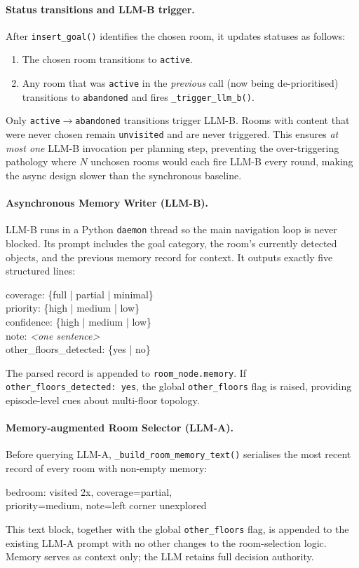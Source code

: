 \documentclass[10pt,twocolumn,letterpaper]{article}
\begin{document}
\paragraph{Status transitions and LLM-B trigger.}
After \texttt{insert\_goal()} identifies the chosen room, it updates
statuses as follows:
\begin{enumerate}[leftmargin=1.4em]
  \item The chosen room transitions to \texttt{active}.
  \item Any room that was \texttt{active} in the \emph{previous} call
        (now being de-prioritised) transitions to \texttt{abandoned} and
        fires \texttt{\_trigger\_llm\_b()}.
\end{enumerate}
Only \texttt{active}$\to$\texttt{abandoned} transitions trigger LLM-B.
Rooms with content that were never chosen remain \texttt{unvisited} and
are never triggered.
This ensures \emph{at most one} LLM-B invocation per planning step,
preventing the over-triggering pathology where $N$ unchosen rooms would
each fire LLM-B every round, making the async design slower than the
synchronous baseline.

\paragraph{Asynchronous Memory Writer (LLM-B).}
LLM-B runs in a Python \texttt{daemon} thread so the main navigation loop
is never blocked.
Its prompt includes the goal category, the room's currently detected
objects, and the previous memory record for context.
It outputs exactly five structured lines:
\begin{center}
\small\ttfamily
coverage: \{full | partial | minimal\}\\
priority: \{high | medium | low\}\\
confidence: \{high | medium | low\}\\
note: \textit{<one sentence>}\\
other\_floors\_detected: \{yes | no\}
\end{center}
The parsed record is appended to \texttt{room\_node.memory}.
If \texttt{other\_floors\_detected: yes}, the global
\texttt{other\_floors} flag is raised, providing episode-level cues about
multi-floor topology.

\paragraph{Memory-augmented Room Selector (LLM-A).}
Before querying LLM-A, \texttt{\_build\_room\_memory\_text()} serialises
the most recent record of every room with non-empty memory:
\begin{center}
\small\ttfamily
bedroom: visited 2x, coverage=partial,\\
\quad priority=medium, note=left corner unexplored
\end{center}
This text block, together with the global \texttt{other\_floors} flag, is
appended to the existing LLM-A prompt with no other changes to the
room-selection logic.
Memory serves as context only; the LLM retains full decision authority.
\end{document}
